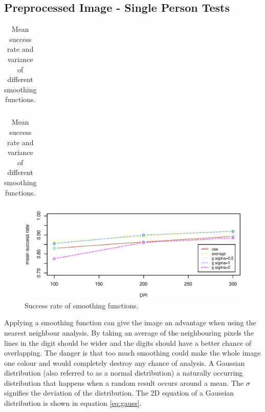 
\subsection{Preprocessed Image - Single Person Tests}

\begin{table}[h]
\centering
    \begin{subtable}[b]{0.56\textwidth}
    \centering
        \begin{tabular}{lcccccc}
            
        \end{tabular}
        \caption{Mean success rate.}
    \end{subtable}
    \begin{subtable}[b]{0.42\textwidth}
    \centering
        \begin{tabular}{lcccccc}
            
        \end{tabular}
        \caption{Variance in success rate.}
    \end{subtable}
    \caption[Success of smoothing functions.]{Mean success rate and variance of different smoothing functions.}
    \label{tb:smooth}
\end{table}

\begin{figure}[h]
\centering
\includegraphics[width=1\textwidth]{graphics/smoothing}
\caption{Success rate of smoothing functions.}
\label{fig:smooth}
\end{figure}

Applying a smoothing function can give the image an advantage when using the nearest neighbour analysis.
By taking an average of the neighbouring pixels the lines in the digit should be wider and the digits should have a better chance of overlapping.
The danger is that too much smoothing could make the whole image one colour and would completely destroy any chance of analysis.
A Gaussian distribution (also referred to as a normal distribution) a naturally occurring distribution that happens when a random result occurs around a mean. 
The $\sigma$ signifies the deviation of the distribution. 
The 2D equation of a Gaussian distribution is shown in equation \ref{eq:gauss}. 

